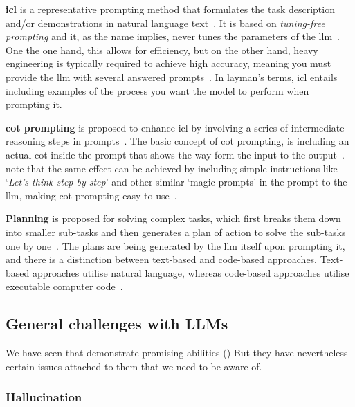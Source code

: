 \textbf{\acrfull{icl}} is a representative prompting method that formulates the task
description and/or demonstrations in natural language text~\cite[44]{llmSurvey}. It is based on
\textit{tuning-free prompting} and it, as the name implies, never tunes the parameters of the
\acrshort{llm}~\cite[15]{promptingSurvey}. One the one hand, this allows for efficiency, but on the
other hand, heavy engineering is typically required to achieve high accuracy, meaning you must
provide the \acrshort{llm} with several answered prompts~\cite[16]{promptingSurvey}. In layman's
terms, \acrshort{icl} entails including examples of the process you want the model to perform when
prompting it.

\textbf{\acrfull{cot} prompting} is proposed to enhance \acrlong{icl} by involving a
series of intermediate reasoning steps in prompts~\cite[44, 52]{llmSurvey}. The basic concept of
\acrshort{cot} prompting, is including an actual \acrlong{cot} inside the prompt that shows the way
form the input to the output~\cite[52]{llmSurvey}.~\citeauthor{llmSurvey} note that the same effect
can be achieved by including simple instructions like `\textit{Let's think step by step}' and other
similar `magic prompts' in the prompt to the \acrshort{llm}, making \acrshort{cot} prompting easy to
use~\cite[52]{llmSurvey}.

\textbf{Planning} is proposed for solving complex tasks, which first breaks them down into smaller
sub-tasks and then generates a plan of action to solve the sub-tasks one by
one~\cite[44, 54]{llmSurvey}. The plans are being generated by the \acrshort{llm} itself upon
prompting it, and there is a distinction between text-based and code-based approaches. Text-based
approaches utilise natural language, whereas code-based approaches utilise executable computer code~\cite[54-55]{llmSurvey}.


\subsection{General challenges with LLMs}\label{sec:llmProblems}

We have seen that  demonstrate promising abilities () But they have nevertheless certain issues attached to them that we need to be aware of.

\subsubsection{Hallucination}\label{sec:llmHallucination}

